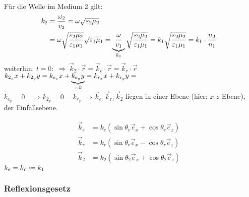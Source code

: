 Für die Welle im Medium 2 gilt:
\begin{align*}
k_2 &= \frac{\omega_2}{v_2} = \omega \sqrt{\varepsilon_2 \mu_2} \\
&= \omega \sqrt{\frac{\varepsilon_2 \mu_2}{\varepsilon_1 \mu_1}} \sqrt{\varepsilon_1 \mu_1} = \underbrace{\frac{\omega}{v_1}}_{k_1} \sqrt{\frac{\varepsilon_2 \mu_2}{\varepsilon_1 \mu_1}} = 	k_1 \sqrt{\frac{\varepsilon_2 \mu_2}{\varepsilon_1 \mu_1}} = k_1 \cdot \frac{n_2}{n_1}
\end{align*}
weiterhin:
$ t=0 : $ $ \Rightarrow \ \vec{k}_2 \cdot \vec{r} = \vec{k}_e \cdot \vec{r} = \vec{k}_r \cdot \vec{r} $\\[5pt]
$ k_{2_x} x + k_{2_y} y = k_{e_x} x + \underbrace{k_{e_y} y}_{=0} = k_{r_x} x + k_{r_y} y =   $\\[5pt]
$ k_{e_y} = 0 \quad \Rightarrow k_{2_y} = 0 = k_{r_y}$
$ \Rightarrow \vec{k}_e, \vec{k}_r, \vec{k}_2 $ liegen in einer Ebene (hier: $ x $-$ z $-Ebene), der Einfallsebene.\\
\begin{minipage}{.5\linewidth}
	\begin{align*}
	\vec{k}_e &= k_e (\sin \theta_e \vec{e}_x + \cos \theta _e \vec{e}_z)\\
	\vec{k}_r &= k_r (\sin \theta_r \vec{e}_x - \cos \theta _r \vec{e}_z)\\
	\vec{k}_2 &= k_2 (\sin \theta_2 \vec{e}_x + \cos \theta _2 \vec{e}_z)
	\end{align*}
	$ k_e = k_r \defeq k_1 $
\end{minipage}%
\begin{minipage}{.5\linewidth}
	\flushright
\end{minipage}%

\subsubsection{Reflexionsgesetz}

